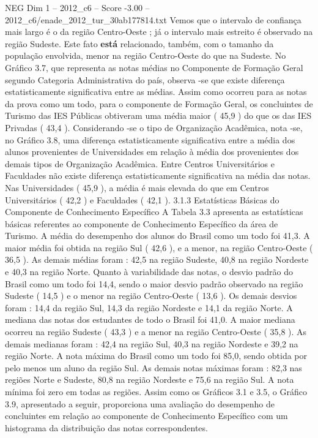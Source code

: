 \begin{textsample}{NEG Dim 1 – 2012\_c6 – Score -3.00 – 2012\_c6/enade\_2012\_tur\_30ab177814.txt}
Vemos que o intervalo de confiança mais largo é o da região Centro-Oeste ; já o intervalo mais estreito é observado na região Sudeste.
Este fato \textbf{está} relacionado, também, com o tamanho da população envolvida, menor na região Centro-Oeste do que na Sudeste.
No Gráfico 3.7, que representa as notas médias no Componente de Formação Geral segundo Categoria Administrativa do país, observa -se que existe diferença estatisticamente significativa entre as médias.
Assim como ocorreu para as notas da prova como um todo, para o componente de Formação Geral, os concluintes de Turismo das IES Públicas obtiveram uma média maior ( 45,9 ) do que os das IES Privadas ( 43,4 ).
Considerando -se o tipo de Organização Acadêmica, nota -se, no Gráfico 3.8, uma diferença estatisticamente significativa entre a média dos alunos provenientes de Universidades em relação à média dos provenientes dos demais tipos de Organização Acadêmica.
Entre Centros Universitários e Faculdades não existe diferença estatisticamente significativa na média das notas.
Nas Universidades ( 45,9 ), a média é mais elevada do que em Centros Universitários ( 42,2 ) e Faculdades ( 42,1 ). 3.1.3 Estatísticas Básicas do Componente de Conhecimento Específico A Tabela 3.3 apresenta as estatísticas básicas referentes ao componente de Conhecimento Específico da área de Turismo.
A média do desempenho dos alunos do Brasil como um todo foi 41,3.
A maior média foi obtida na região Sul ( 42,6 ), e a menor, na região Centro-Oeste ( 36,5 ).
As demais médias foram : 42,5 na região Sudeste, 40,8 na região Nordeste e 40,3 na região Norte.
Quanto à variabilidade das notas, o desvio padrão do Brasil como um todo foi 14,4, sendo o maior desvio padrão observado na região Sudeste ( 14,5 ) e o menor na região Centro-Oeste ( 13,6 ).
Os demais desvios foram : 14,4 da região Sul, 14,3 da região Nordeste e 14,1 da região Norte.
A mediana das notas dos estudantes de todo o Brasil foi 41,0.
A maior mediana ocorreu na região Sudeste ( 43,3 ) e a menor na região Centro-Oeste ( 35,8 ).
As demais medianas foram : 42,4 na região Sul, 40,3 na região Nordeste e 39,2 na região Norte.
A nota máxima do Brasil como um todo foi 85,0, sendo obtida por pelo menos um aluno da região Sul.
As demais notas máximas foram : 82,3 nas regiões Norte e Sudeste, 80,8 na região Nordeste e 75,6 na região Sul.
A nota mínima foi zero em todas as regiões.
Assim como os Gráficos 3.1 e 3.5, o Gráfico 3.9, apresentado a seguir, proporciona uma avaliação do desempenho de concluintes em relação ao componente de Conhecimento Específico com um histograma da distribuição das notas correspondentes.

\end{textsample}
